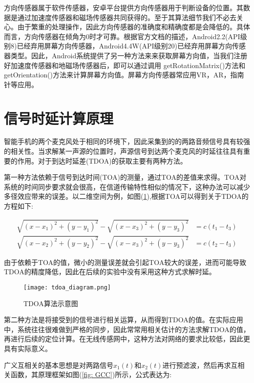 \documentclass[winfonts]{njuthesis}
\begin{document}
		方向传感器属于软件传感器，安卓平台提供方向传感器用于判断设备的位置。其数据是通过加速度传感器和磁场传感器共同获得的。至于其算法细节我们不必去关心。由于繁重的处理操作，因此方向传感器的准确度和精确度都是会降低的。具体而言，方向传感器在倾角为0时才可靠。根据官方文档的描述，Android2.2(API级别8)已经弃用屏幕方向传感器，Android4.4W(API级别20)已经弃用屏幕方向传感器类型。因此，Android系统提供了另一种方法来来获取屏幕方向值，当我们注册好加速度传感器和地磁场传感器后，即可以通过调用 getRotationMatrix()方法和 getOrientation()方法来计算屏幕方向值。屏幕方向传感器常应用VR，AR，指南针等应用。

	
	\section{信号时延计算原理}
	
		智能手机的两个麦克风处于相同的环境下，因此采集到的的两路音频信号具有较强的相关性。当求解某一声源的位置时，声源信号到达两个麦克风的时延往往具有重要的作用。对于到达时延差(TDOA)的获取主要有两种方法。
		
		第一种方法依赖于信号到达时间(TOA)的测量，通过TOA的差值来求得。TOA对系统的时间同步要求就会很高，在信道传输特性相似的情况下，这种办法可以减少多径效应带来的误差。以二维空间为例，如图(\ref{fig: tdoa-diagram}),根据TOA可以得到关于TDOA的方程如下:
		
		\begin{align}
			\sqrt{(x-x_1)^2+(y-y_1)^2} - \sqrt{(x-x_3)^2+(y-y_3)^2} &= c(t_1-t_3)\\
			\sqrt{(x-x_2)^2+(y-y_2)^2} - \sqrt{(x-x_3)^2+(y-y_3)^2} &= c(t_2-t_3)
		\end{align}
		
		由于依赖于TOA的值，微小的测量误差就会引起TOA较大的误差，进而可能导致TDOA的精度降低，因此在后续的实验中没有采用这种方式求解时延。
		
		\begin{figure}[H]
			\centering
			\texttt{[image: tdoa\_diagram.png]} 
			\caption{TDOA算法示意图}
			\label{fig: tdoa-diagram}
		\end{figure}
		
		
		第二种方法是将接受到的信号进行相关运算，从而得到TDOA的值。在实际应用中，系统往往很难做到严格的同步，因此常常用相关估计的方法求解TDOA的值，再进行后续的定位计算。在无线传感网中，这种方法对网络的要求比较低，因此更具有实际意义。
		
		广义互相关的基本思想是对两路信号$x_1(t)$和$x_2(t)$进行预滤波，然后再求互相关函数，其原理框架如图(\ref{fig: GCC})所示，公式表达为:
		
\end{document}
